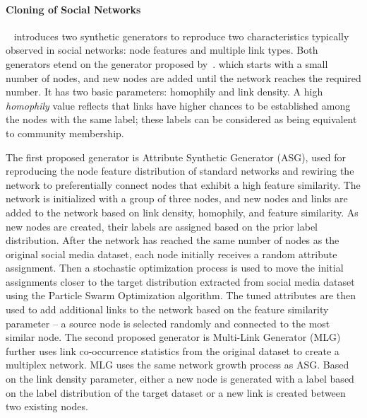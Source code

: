 \paragraph{Cloning of Social Networks} ~\cite{Sukthankar-SocialInfo2014}
introduces two synthetic generators to reproduce two characteristics typically
observed in social networks: node features and multiple link types. Both
generators etend on the generator proposed by~\cite{wang2011leveraging}.
which starts with a small number of
nodes, and new nodes are added until the network reaches the required number. It
has two basic parameters: homophily and link density. A high \emph{homophily}
value reflects that links have higher chances to be established among the nodes with the
same label; these labels can be considered as being equivalent to community
membership.

The first proposed generator is Attribute Synthetic Generator (ASG), used for
reproducing the node feature distribution of standard networks and rewiring the
network to preferentially connect nodes that exhibit a high feature similarity.
The network is initialized with a group of three nodes, and new nodes and links
are added to the network based on link density, homophily, and feature
similarity. As new nodes are created, their labels are assigned based on the
prior label distribution. After the network has reached the same number of nodes
as the original social media dataset, each node initially receives a random
attribute assignment. Then a stochastic optimization process is used to move the
initial assignments closer to the target distribution extracted from social
media dataset using the Particle Swarm Optimization algorithm. The tuned
attributes are then used to add additional links to the network based on the
feature similarity parameter -- a source node is selected randomly and connected
to the most similar node. The second proposed generator is Multi-Link Generator
(MLG) further  uses link co-occurrence statistics from the original dataset to
create a multiplex network. MLG uses the same network growth process as ASG.
Based on the link density parameter, either a new node is generated with a label
based on the label distribution of the target dataset or a new link is created
between two existing nodes.


